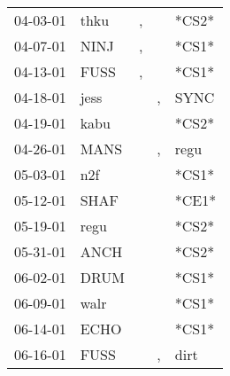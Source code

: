 \begin{supertabular}{p{0.07\textwidth}p{0.06\textwidth}p{0.02\textwidth}p{0.02\textwidth}p{0.06\textwidth}}
          04-03-01\textsuperscript{} &           thku\textsuperscript{} &                , &                  &                            *CS2* \\
          04-07-01\textsuperscript{} &           NINJ\textsuperscript{} &                , &                  &                            *CS1* \\
          04-13-01\textsuperscript{} &           FUSS\textsuperscript{} &                , &                  &                            *CS1* \\
          04-18-01\textsuperscript{} &           jess\textsuperscript{} &                  &                , &           SYNC\textsuperscript{} \\
          04-19-01\textsuperscript{} &           kabu\textsuperscript{} &                  &                  &                            *CS2* \\
          04-26-01\textsuperscript{} &           MANS\textsuperscript{} &                  &                , &           regu\textsuperscript{} \\
          05-03-01\textsuperscript{} &            n2f\textsuperscript{} &                  &                  &                            *CS1* \\
          05-12-01\textsuperscript{} &           SHAF\textsuperscript{} &                  &                  &                            *CE1* \\
          05-19-01\textsuperscript{} &           regu\textsuperscript{} &                  &                  &                            *CS2* \\
          05-31-01\textsuperscript{} &           ANCH\textsuperscript{} &                  &                  &                            *CS2* \\
          06-02-01\textsuperscript{} &           DRUM\textsuperscript{} &                  &                  &                            *CS1* \\
          06-09-01\textsuperscript{} &           walr\textsuperscript{} &                  &                  &                            *CS1* \\
          06-14-01\textsuperscript{} &           ECHO\textsuperscript{} &                  &                  &                            *CS1* \\
          06-16-01\textsuperscript{} &           FUSS\textsuperscript{} &                  &                , &           dirt\textsuperscript{} \\

\end{supertabular}
